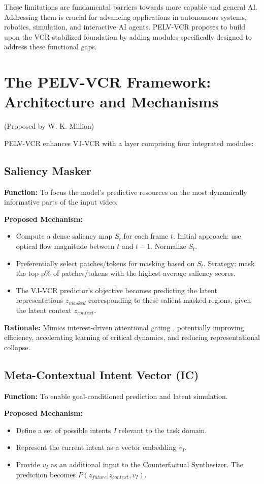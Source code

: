 \documentclass[11pt]{article}
\begin{document}
These limitations are fundamental barriers towards more capable and general AI. Addressing them is crucial for advancing applications in autonomous systems, robotics, simulation, and interactive AI agents. PELV-VCR proposes to build upon the VCR-stabilized foundation by adding modules specifically designed to address these functional gaps.

\section{The PELV-VCR Framework: Architecture and Mechanisms}
\label{sec:framework}
(Proposed by W. K. Million)

PELV-VCR enhances VJ-VCR with a layer comprising four integrated modules:

\subsection{Saliency Masker}
\textbf{Function:} To focus the model's predictive resources on the most dynamically informative parts of the input video.

\textbf{Proposed Mechanism:}
\begin{itemize}
    \item Compute a dense saliency map $S_t$ for each frame $t$. Initial approach: use optical flow magnitude between $t$ and $t-1$. Normalize $S_t$.
    \item Preferentially select patches/tokens for masking based on $S_t$. Strategy: mask the top p\% of patches/tokens with the highest average saliency scores.
    \item The VJ-VCR predictor's objective becomes predicting the latent representations $z_{masked}$ corresponding to these salient masked regions, given the latent context $z_{context}$.
\end{itemize}

\textbf{Rationale:} Mimics interest-driven attentional gating \cite{DodsonVarious}, potentially improving efficiency, accelerating learning of critical dynamics, and reducing representational collapse.

\subsection{Meta-Contextual Intent Vector (IC)}
\textbf{Function:} To enable goal-conditioned prediction and latent simulation.

\textbf{Proposed Mechanism:}
\begin{itemize}
    \item Define a set of possible intents $I$ relevant to the task domain.
    \item Represent the current intent as a vector embedding $v_I$.
    \item Provide $v_I$ as an additional input to the Counterfactual Synthesizer. The prediction becomes $P(z_{future} | z_{context}, v_I)$.
\end{itemize}
\end{document}
